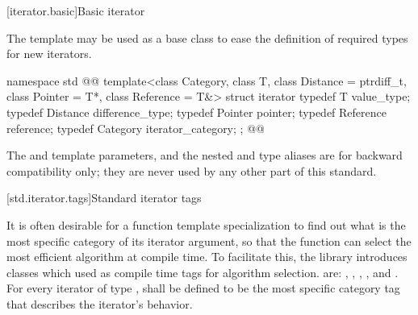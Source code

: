 [iterator.basic]{Basic iterator}

\pnum
The
template may be used as a base class to ease the definition of required types
for new iterators.

%
\begin{codeblock}
namespace std { @@
  template<class Category, class T, class Distance = ptrdiff_t,
    class Pointer = T*, class Reference = T&>
  struct iterator {
    typedef T         value_type;
    typedef Distance  difference_type;
    typedef Pointer   pointer;
    typedef Reference reference;
    typedef Category  iterator_category;
  };
}@\newtxt{\}\}}@
\end{codeblock}

\begin{addedblock}
\pnum
\enternote The  and  template parameters, and the nested 
and  type aliases are for backward compatibility only; they are never used by any
other part of this standard.\exitnote
\end{addedblock}

[std.iterator.tags]{Standard iterator tags}

\pnum
{}%
%
%
%
%
%
It is often desirable for a
function template specialization
to find out what is the most specific category of its iterator
argument, so that the function can select the most efficient algorithm at compile time.
To facilitate this, the
library introduces
classes which  used as compile time tags for algorithm selection.
 are:
,
,
,
,
and
.
For every iterator of type
,
shall be defined to be the most specific category tag that describes the
iterator's behavior.

